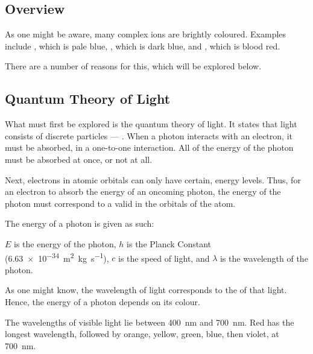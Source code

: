 		\subsection{Overview}

			As one might be aware, many complex ions are brightly coloured. Examples include , which is pale blue,
			, which is dark blue, and , which is blood red.

			There are a number of reasons for this, which will be explored below.



		\subsection{Quantum Theory of Light}

			What must first be explored is the quantum theory of light. It states that light consists of discrete particles --- .
			When a photon interacts with an electron, it must be  absorbed, in a one-to-one interaction. All of the energy of
			the photon must be absorbed at once, or not at all.

			Next, electrons in atomic orbitals can only have certain,  energy levels. Thus, for an electron to absorb the energy
			of an oncoming photon, the energy of the photon must correspond  to a valid  in the orbitals of
			the atom.

			The energy of a photon is given as such:


			$E$ is the energy of the photon, $h$ is the Planck Constant (\SI{6.63e-34}{\square\metre\kilo\gram\per\second}), $c$ is
			the speed of light, and $\lambda$ is the wavelength of the photon.

			As one might know, the wavelength of light corresponds to the  of that light. Hence, the energy of a photon depends
			on its colour.

			The wavelengths of visible light lie between \SI{400}{\nano\metre} and \SI{700}{\nano\metre}. Red has the longest wavelength,
			followed by orange, yellow, green, blue, then violet, at \SI{700}{\nano\metre}.



		\pagebreak
